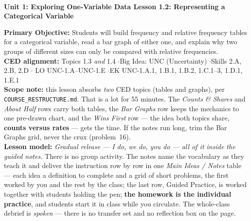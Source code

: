 \documentclass[10pt]{article}
\newcommand{\UnitNumberName}{Unit 1: Exploring One-Variable Data \quad}
\newcommand{\LessonNumberName}{Lesson 1.2: Representing a Categorical Variable}
\begin{document}
\begin{center}
    {\Large\bfseries \CourseName \\
    {\small\bfseries \UnitNumberName \LessonNumberName}}
\end{center}

\begin{tcolorbox}[colback=sky, colframe=navy, boxrule=0.9pt, arc=2mm,
    left=2mm, right=2mm, top=1.5mm, bottom=1.5mm]
    \textbf{Primary Objective:} Students will build frequency and relative frequency tables for
    a categorical variable, read a bar graph of either one, and explain why two groups of
    different sizes can only be compared with relative frequencies.
    \\[2pt]
    \textbf{CED alignment:} Topics 1.3 \emph{and} 1.4 \quad$\cdot$\quad Big Idea: UNC
    (Uncertainty) \quad$\cdot$\quad Skills 2.A, 2.B, 2.D \quad$\cdot$\quad
    LO UNC-1.A--UNC-1.E \quad$\cdot$\quad EK UNC-1.A.1, 1.B.1, 1.B.2, 1.C.1--3, 1.D.1, 1.E.1
    \\[2pt]
    \textbf{Scope note:} this lesson absorbs \emph{two} CED topics (tables and graphs), per
    \texttt{COURSE\_RESTRUCTURE.md}. That is a lot for 55 minutes. The \emph{Counts \& Shares}
    and \emph{About Half} rows carry both tables, the \emph{Bar Graphs} row keeps the mechanics
    to one pre-drawn chart, and the \emph{Wins First} row --- the idea both topics share,
    \textbf{counts versus rates} --- gets the time. If the notes run long, trim the Bar Graphs
    grid, never the crux (problem~16).
    \\[2pt]
    \textbf{Lesson model:} \emph{Gradual release --- I do, we do, you do --- all of it inside
    the guided notes.} There is no group activity. The notes name the vocabulary as they teach
    it and deliver the instruction row by row in one \emph{Main Ideas / Notes} table --- each
    idea a definition to complete and a grid of short problems, the first worked by you and the
    rest by the class; the last row, Guided Practice, is worked together with students holding
    the pen; \textbf{the homework is the individual practice}, and students
    start it in class while you circulate. The whole-class debrief is \emph{spoken} ---
    there is no transfer set and no reflection box on the page.
\end{tcolorbox}
\end{document}
